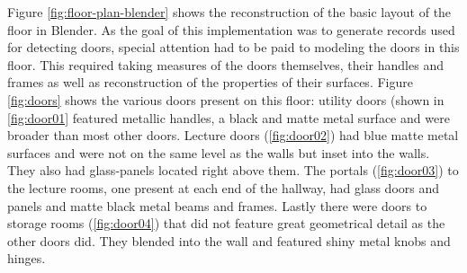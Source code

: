 Figure \ref{fig:floor-plan-blender} shows the reconstruction of the basic layout of the floor in Blender. As the goal of this implementation was to generate records used for detecting doors, special attention had to be paid to modeling the doors in this floor. This required taking measures of the doors themselves, their handles and frames as well as reconstruction of the properties of their surfaces. Figure \ref{fig:doors} shows the various doors present on this floor: utility doors (shown in \ref{fig:door01} featured metallic handles, a black and matte metal surface and were broader than most other doors. Lecture doors (\ref{fig:door02}) had blue matte metal surfaces and were not on the same level as the walls but inset into the walls. They also had glass-panels located right above them. The portals (\ref{fig:door03}) to the lecture rooms, one present at each end of the hallway, had glass doors and panels and matte black metal beams and frames. Lastly there were doors to storage rooms (\ref{fig:door04}) that did not feature great geometrical detail as the other doors did. They blended into the wall and featured shiny metal knobs and hinges.

